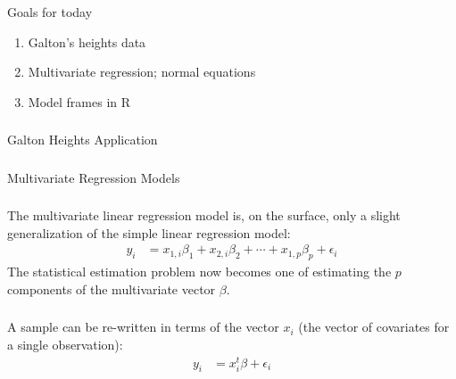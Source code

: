 \begin{frame}[fragile] \frametitle{}

{\color{yaleblue}\fontsize{16pt}{20pt}\selectfont Goals for today}

\begin{enumerate}
\item Galton's heights data
\item Multivariate regression; normal equations
\item Model frames in R
\end{enumerate}

\end{frame}

\begin{frame}[fragile] \frametitle{}

\begin{flushright}
{\color{yaleblue}\sc\fontsize{1cm}{0cm}\selectfont Galton Heights Application}
\end{flushright}

\end{frame}

\begin{frame}[fragile] \frametitle{}

\begin{flushright}
{\color{yaleblue}\sc\fontsize{1cm}{0cm}\selectfont Multivariate Regression Models}
\end{flushright}

\end{frame}

\begin{frame}[fragile] \frametitle{}

The multivariate linear regression model is, on the surface,
only a slight generalization of the simple linear regression model:
\begin{align*}
y_i &= x_{1,i} \beta_1 + x_{2,i} \beta_2 + \cdots + x_{1,p} \beta_p + \epsilon_i
\end{align*}
\pause The statistical estimation problem now becomes one of
estimating the $p$ components of the multivariate vector $\beta$.

\end{frame}


\begin{frame}[fragile] \frametitle{}

A sample can be re-written in terms of the vector $x_i$
(the vector of covariates for a single observation):
\begin{align*}
y_i &= x_{i}^t \beta + \epsilon_i
\end{align*}

\end{frame}

